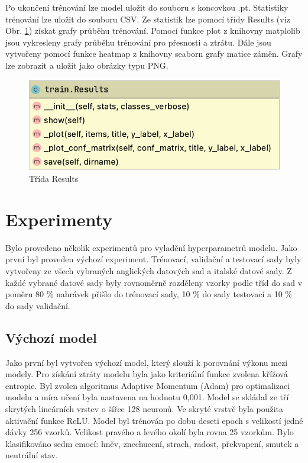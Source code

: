 \documentclass[FM,BP]{tulthesis}
\begin{document}
Po ukončení trénování lze model uložit do souboru s koncovkou .pt. Statistiky trénování lze uložit do souboru CSV. Ze statistik lze pomocí třídy Results (viz Obr. \ref{fig:results}) získat grafy průběhu trénování. Pomocí funkce plot z knihovny matplolib jsou vykresleny grafy průběhu trénování pro přesnosti a ztrátu. Dále jsou vytvořeny pomocí funkce heatmap z knihovny seaborn grafy matice záměn. Grafy lze zobrazit a uložit jako obrázky typu PNG.

\begin{figure}[ht]
\centerline{\includegraphics[scale=.3]{train-results.png}}
\caption{Třída Results}
\label{fig:results}
\end{figure}
\FloatBarrier

\chapter{Experimenty} %
Bylo provedeno několik experimentů pro vyladění hyperparametrů modelu. Jako první byl proveden výchozí experiment. Trénovací, validační a testovací sady byly vytvořeny ze všech vybraných anglických datových sad a italské datové sady. Z každé vybrané datové sady byly rovnoměrně rozděleny vzorky podle tříd do sad v poměru 80 \% nahrávek přišlo do trénovací sady, 10 \% do sady testovací a 10 \% do sady validační.

\section{Výchozí model}
Jako první byl vytvořen výchozí model, který slouží k porovnání výkonu mezi modely. Pro získání ztráty modelu byla jako kriteriální funkce zvolena křížová entropie. Byl zvolen algoritmus Adaptive Momentum (Adam) pro optimalizaci modelu a míra učení byla nastavena na hodnotu 0,001. Model se skládal ze tří skrytých lineárních vrstev o šířce 128 neuronů. Ve skryté vrstvě byla použita aktivační funkce ReLU. Model byl trénován po dobu deseti epoch s velikostí jedné dávky 256 vzorků. Velikost pravého a levého okolí byla rovna 25 vzorkům. Bylo klasifikováno sedm emocí: hněv, znechucení, strach, radost, překvapení, smutek a neutrální stav.
\end{document}
